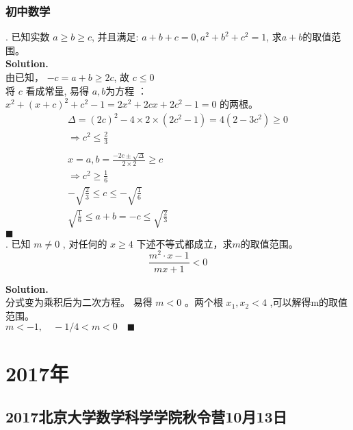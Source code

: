\documentclass[UTF8]{article}
\begin{document}
\subsubsection{初中数学}
. 已知实数 $a \ge b \ge c$, 并且满足: $a+b+c=0, a^2+b^2+c^2=1$, 求$a+b$的取值范围。 \\
\noindent \textbf{Solution.} \\
由已知， $ -c = a + b \ge 2c$, 故 $  c \le 0 $ \\
将 $c$ 看成常量, 易得 $a,b$为方程 ： $x^2 + (x+c)^2 + c^2 -1 = 2x^2 + 2cx + 2c^2 -1 =0$ 的两根。
\begin{align*}
 \Delta = (2c)^2 - 4\times 2 \times (2c^2-1) = 4(2-3c^2)\ge 0 \\
\Rightarrow  c^2 \le \frac{2}{3} \\
 \\
 x =a,b = \frac{-2c \pm \sqrt{\Delta }}{2\times 2} \ge c \\
 \Rightarrow c^2 \ge \frac{1}{6} \\
-\sqrt{\frac{2}{3}} \le c \le -\sqrt{\frac{1}{6}} \\
\sqrt{\frac{1}{6}} \le a+b=-c \le \sqrt{\frac{2}{3}}
\end{align*}
$\blacksquare$ \\

. 已知 $ m \ne 0$ , 对任何的 $x\ge4$ 下述不等式都成立，求$m$的取值范围。 
$$ \frac{m^2\cdot x -1}{mx+1} < 0 $$

\noindent \textbf{Solution.} \\
分式变为乘积后为二次方程。 易得 $m<0$ 。两个根 $x_1,x_2 <4$ ,可以解得m的取值范围。 \\
$m<-1 , \quad -1/4<m<0 \quad \blacksquare$

\section{2017年}

\subsection{2017北京大学数学科学学院秋令营10月13日}
\end{document}
